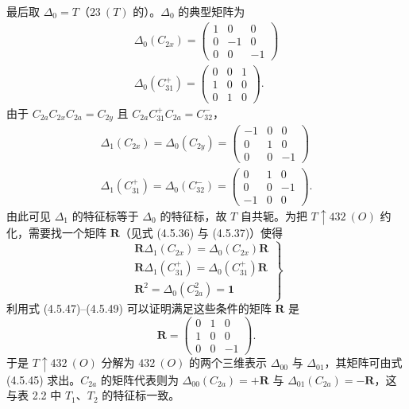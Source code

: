 最后取 $\Delta_{0} = T$（$23\ (T)$ 的）。$\Delta_{0}$ 的典型矩阵为
\begin{equation*}
\begin{array}{l}
\Delta_{0}(C_{2x}) = \begin{pmatrix} 1 & 0 & 0\\ 0 & -1 & 0\\ 0 & 0 & -1 \end{pmatrix}\\[2ex]
\Delta_{0}(C^{+}_{31}) = \begin{pmatrix} 0 & 0 & 1\\ 1 & 0 & 0\\ 0 & 1 & 0 \end{pmatrix}.
\end{array}
\tag{4.5.47}
\end{equation*}
由于 $C_{2a}C_{2x}C_{2a} = C_{2y}$ 且 $C_{2a}C^{+}_{31}C_{2a} = C^{-}_{32}$，
\begin{equation*}
\begin{array}{l}
\Delta_{1}(C_{2x}) = \Delta_{0}(C_{2y}) = \begin{pmatrix} -1 & 0 & 0\\ 0 & 1 & 0\\ 0 & 0 & -1 \end{pmatrix}\\[2ex]
\Delta_{1}(C^{+}_{31}) = \Delta_{0}(C^{-}_{32}) = \begin{pmatrix} 0 & 1 & 0\\ 0 & 0 & -1\\ -1 & 0 & 0 \end{pmatrix}.
\end{array}
\tag{4.5.48}
\end{equation*}
由此可见 $\Delta_{1}$ 的特征标等于 $\Delta_{0}$ 的特征标，故 $T$ 自共轭。为把 $T \uparrow 432\ (O)$ 约化，需要找一个矩阵 $\mathbf{R}$（见式 (4.5.36) 与 (4.5.37)）使得
\begin{equation*}
\left.
\begin{array}{l}
\mathbf{R}\Delta_{1}(C_{2x}) = \Delta_{0}(C_{2x})\mathbf{R}\\
\mathbf{R}\Delta_{1}(C^{+}_{31}) = \Delta_{0}(C^{+}_{31})\mathbf{R}\\
\mathbf{R}^{2} = \Delta_{0}(C^{2}_{2a}) = \mathbf{1}
\end{array}
\right\}
\tag{4.5.49}
\end{equation*}
利用式 (4.5.47)--(4.5.49) 可以证明满足这些条件的矩阵 $\mathbf{R}$ 是
\begin{equation*}
\mathbf{R} = \begin{pmatrix} 0 & 1 & 0\\ 1 & 0 & 0\\ 0 & 0 & -1 \end{pmatrix}.
\tag{4.5.50}
\end{equation*}
于是 $T \uparrow 432\ (O)$ 分解为 $432\ (O)$ 的两个三维表示 $\Delta_{00}$ 与 $\Delta_{01}$，其矩阵可由式 (4.5.45) 求出。$C_{2a}$ 的矩阵代表则为 $\Delta_{00}(C_{2a}) = +\mathbf{R}$ 与 $\Delta_{01}(C_{2a}) = -\mathbf{R}$，这与表 2.2 中 $T_{1}$、$T_{2}$ 的特征标一致。
